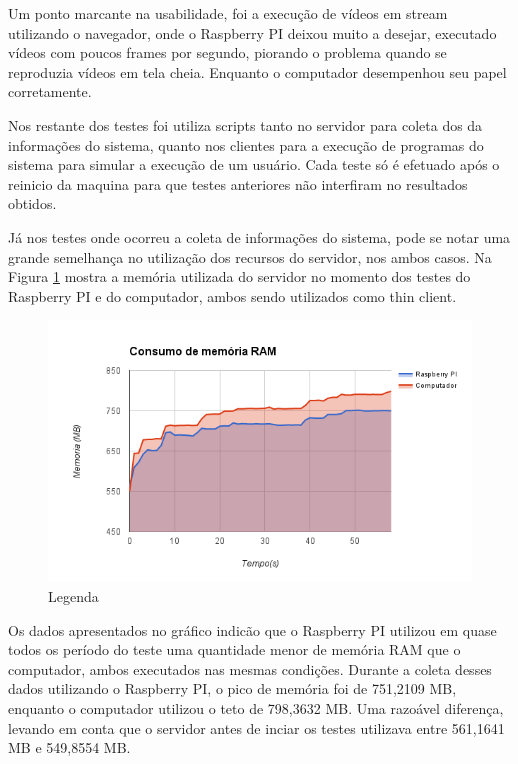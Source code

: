 \documentclass[
	12pt,				%
	openright,			%
	twoside,			%
	a4paper,			%
	chapter=TITLE,		%
	english,			%
	brazil				%
	]{abntex2}
\begin{document}
Um ponto marcante na usabilidade, foi a execução de vídeos em stream utilizando o navegador, onde o Raspberry PI deixou muito a desejar, executado vídeos com poucos frames por segundo, piorando o problema quando se reproduzia vídeos em tela cheia. Enquanto o computador desempenhou seu papel corretamente.

Nos restante dos testes foi utiliza scripts tanto no servidor para coleta dos da informações do sistema, quanto nos clientes para a execução de programas do sistema para simular a execução de um usuário. Cada teste só é efetuado após o reinicio da maquina para que testes anteriores não interfiram no resultados obtidos.

Já nos testes onde ocorreu a coleta de informações do sistema, pode se notar uma grande semelhança no utilização dos recursos do servidor, nos ambos casos. Na Figura \ref{fig:memoria} mostra a memória utilizada do servidor no momento dos testes do Raspberry PI e do  computador, ambos sendo utilizados como thin client.

\begin{figure}[!htb]
\centering
\includegraphics[scale=0.8]{Imagens/memoria}
\caption{Legenda}
\label{fig:memoria}
\end{figure}


Os dados apresentados no gráfico indicão que o Raspberry PI utilizou em quase todos os período do teste uma quantidade menor de memória RAM que o computador, ambos executados nas mesmas condições. Durante a coleta desses dados utilizando o Raspberry PI, o pico de memória foi de 751,2109 MB, enquanto o computador utilizou o teto de 798,3632 MB. Uma razoável diferença, levando em conta que o servidor antes de inciar os testes utilizava entre 561,1641 MB e 549,8554 MB. 
\end{document}
